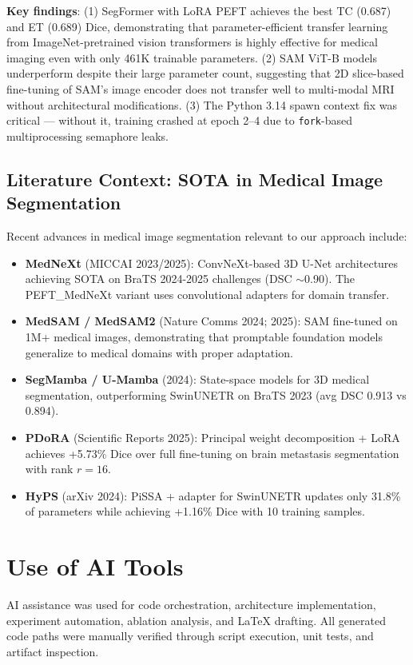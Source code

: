 \documentclass[11pt,a4paper]{article}
\begin{document}
\textbf{Key findings}: (1) SegFormer with LoRA PEFT achieves the best TC (0.687) and ET (0.689) Dice, demonstrating that parameter-efficient transfer learning from ImageNet-pretrained vision transformers is highly effective for medical imaging even with only 461K trainable parameters. (2) SAM ViT-B models underperform despite their large parameter count, suggesting that 2D slice-based fine-tuning of SAM's image encoder does not transfer well to multi-modal MRI without architectural modifications. (3) The Python 3.14 spawn context fix was critical — without it, training crashed at epoch 2–4 due to \texttt{fork}-based multiprocessing semaphore leaks.

\subsection{Literature Context: SOTA in Medical Image Segmentation}

Recent advances in medical image segmentation relevant to our approach include:

\begin{itemize}
  \item \textbf{MedNeXt} (MICCAI 2023/2025): ConvNeXt-based 3D U-Net architectures achieving SOTA on BraTS 2024-2025 challenges (DSC $\sim$0.90). The PEFT\_MedNeXt variant uses convolutional adapters for domain transfer.
  \item \textbf{MedSAM / MedSAM2} (Nature Comms 2024; 2025): SAM fine-tuned on 1M+ medical images, demonstrating that promptable foundation models generalize to medical domains with proper adaptation.
  \item \textbf{SegMamba / U-Mamba} (2024): State-space models for 3D medical segmentation, outperforming SwinUNETR on BraTS 2023 (avg DSC 0.913 vs 0.894).
  \item \textbf{PDoRA} (Scientific Reports 2025): Principal weight decomposition + LoRA achieves +5.73\% Dice over full fine-tuning on brain metastasis segmentation with rank $r=16$.
  \item \textbf{HyPS} (arXiv 2024): PiSSA + adapter for SwinUNETR updates only 31.8\% of parameters while achieving +1.16\% Dice with 10 training samples.
\end{itemize}

\section{Use of AI Tools}
AI assistance was used for code orchestration, architecture implementation, experiment automation, ablation analysis, and LaTeX drafting. All generated code paths were manually verified through script execution, unit tests, and artifact inspection.
\end{document}

